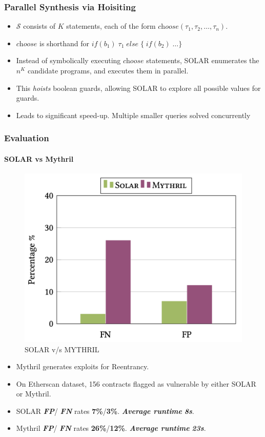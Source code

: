 \documentclass{beamer}
\newcommand{\hole}{\textit{choose}}
\newcommand{\boldIt}[1]{\textbf{\textit{#1}}}
\begin{document}
\begin{frame}[fragile]
  \frametitle{Parallel Synthesis via Hoisiting}
  \begin{itemize}
    \item $\mathcal{S}$ consists of $K$ statements, each of the form
        $\hole(\tau_1, \tau_2, \dots, \tau_n)$.
      \item $\hole$ is shorthand for $\textit{if}(b_1)\; \tau_1\;
        \textit{else}\; \{\; \textit{if}(b_2)\; \dots \}$
      \item Instead of symbolically executing $\hole$ statements,
        SOLAR enumerates the $n^K$ candidate programs, and
        executes them in parallel.
      \item This \textit{hoists} boolean guards, allowing SOLAR
        to explore all possible values for guards.
      \item Leads to significant speed-up.
        Multiple smaller queries solved concurrently
  \end{itemize}
\end{frame}



\begin{frame}[fragile]
  \frametitle{Evaluation}
  \framesubtitle{SOLAR vs Mythril}
  \begin{figure}
    \centering
    \includegraphics[scale=0.25]{evaluationMythril}
    \caption{SOLAR v/s MYTHRIL}
  \end{figure}
  \begin{itemize}
    \item Mythril generates exploits for Reentrancy.
    \item On Etherscan dataset, 156 contracts flagged
      as vulnerable by either SOLAR or Mythril.
    \item SOLAR \boldIt{FP}/ \boldIt{FN} rates \textbf{7\%}/\textbf{3\%}.
      \boldIt{Average runtime} \boldIt{8s}.
    \item Mythril \boldIt{FP}/ \boldIt{FN} rates \textbf{26\%}/\textbf{12\%}.
      \boldIt{Average runtime} \boldIt{23s}.
  \end{itemize}
\end{frame}
\end{document}
